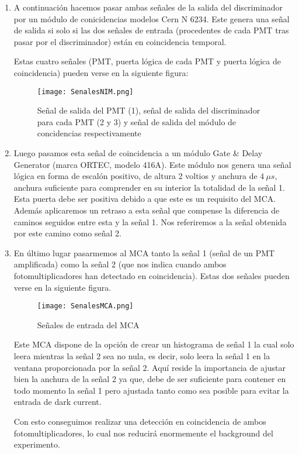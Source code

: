\begin{enumerate}
\item{} A continuación hacemos pasar ambas señales de la salida del discriminador por un módulo de conicidencias modelos Cern N 6234. Este genera una señal de salida si solo si las dos señales de entrada (procedentes de cada PMT tras pasar por el discriminador) están en coincidencia temporal. 

Estas cuatro señales (PMT, puerta lógica de cada PMT y puerta lógica de coincidencia) pueden verse en la siguiente figura:

\begin{figure}[hbtp]
\centering
\texttt{[image: SenalesNIM.png]}
\caption{ Señal de salida del PMT (1), señal de salida del discriminador para cada PMT (2 y 3) y señal de salida del módulo de concidencias respectivamente\label{señales}}
\end{figure}


\item {} Luego pasamos esta señal de coincidencia a un módulo Gate \& Delay Generator (marca ORTEC, modelo 416A). Este módulo nos genera una señal lógica en forma de escalón positivo, de altura 2 voltios y anchura de $4~\mu s$, anchura suficiente para comprender en su interior la totalidad de la señal 1. Esta puerta debe ser positiva debido a que este es un requisito del MCA. Además aplicaremos un retraso a esta señal que compense la diferencia de caminos seguidos entre esta y la señal 1. Nos referiremos a la señal obtenida por este camino como señal 2.

\item {} En último lugar pasarmemos al MCA tanto la señal 1 (señal de un PMT amplificada) como la señal 2 (que nos indica cuando ambos fotomultiplicadores han detectado en coincidencia). Estas dos señales pueden verse en la siguiente figura.

\begin{figure}[hbtp]
\centering
\texttt{[image: SenalesMCA.png]}
\caption{Señales de entrada del MCA\label{señales MCA}}
\end{figure}


Este MCA dispone de la opción de crear un histograma de señal 1 la cual solo leera mientras la señal 2 sea no nula, es decir, solo leera la señal 1 en la ventana proporcionada por la señal 2. Aquí reside la importancia de ajustar bien la anchura de la señal 2 ya que, debe de ser suficiente para contener en todo momento la señal 1 pero ajustada tanto como sea posible para evitar la entrada de dark current.

Con esto conseguimos realizar una detección en coincidencia de ambos fotomultiplicadores, lo cual nos reducirá enormemente el background del experimento.

\end{enumerate}



